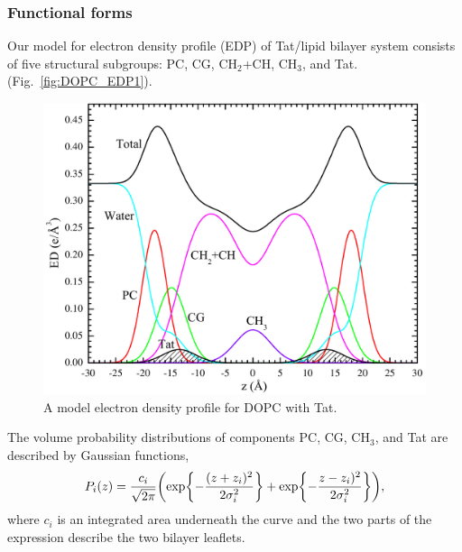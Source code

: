 \subsubsection{Functional forms}
Our model for electron density profile (EDP)
of Tat/lipid bilayer system consists of five structural subgroups: PC, CG,
CH$_2$+CH, CH$_3$, and Tat. 
(Fig.~\ref{fig:DOPC_EDP1}).
\begin{figure}[htbp]
  \centering
  \includegraphics[width=\textwidth]{figures/Tat/SDP_Results/EDP/DOPC_Tat_model_EDP}
  \caption{A model electron density profile for DOPC with Tat.}
  \label{fig:DOPC_EDP}
\end{figure}
The volume probability distributions of components PC, CG, CH$_3$, and Tat 
are described by Gaussian functions,
\begin{equation}
  P_i(z)=\frac{c_i}{\sqrt{2\pi}}\mathopen{}\left( 
    \exp\mathopen{}\left\lbrace -\frac{(z+z_i)^2}{2\sigma_i^2} \right\rbrace\mathclose{}
	+ \exp\mathopen{}\left\lbrace -\frac{z-z_i)^2}{2\sigma_i^2} \right\rbrace\mathclose{}
   \right)\mathclose{},
\end{equation}
where $c_i$ is an integrated area underneath the curve and the two parts of the 
expression describe the two bilayer leaflets. 

